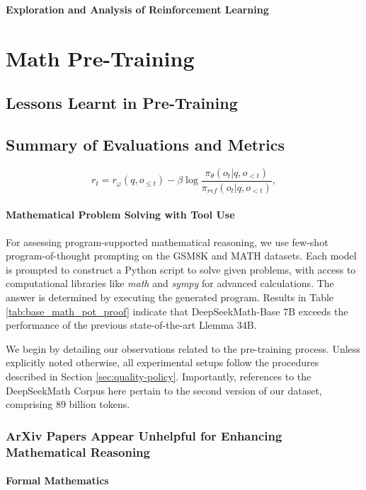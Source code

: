 \begin{itemize}[topsep=0pt]
\textbf{Exploration and Analysis of Reinforcement Learning}

\section{Math Pre-Training}

\subsection{Lessons Learnt in Pre-Training}

\subsection{Summary of Evaluations and Metrics}

\begin{equation}
    r_{t} = r_\varphi(q, o_{\le t}) - \beta \log\frac{\pi_{\theta}(o_{t}|q, o_{<t})}{\pi_{ref}(o_{t}|q, o_{<t})},
\label{eq:PPO-reward}
\end{equation}

\paragraph{Mathematical Problem Solving with Tool Use} For assessing program-supported mathematical reasoning, we use few-shot program-of-thought prompting \citep{pot,pal} on the GSM8K and MATH datasets. Each model is prompted to construct a Python script to solve given problems, with access to computational libraries like \textit{math} and \textit{sympy} for advanced calculations. The answer is determined by executing the generated program. Results in Table \ref{tab:base_math_pot_proof} indicate that DeepSeekMath-Base 7B exceeds the performance of the previous state-of-the-art Llemma 34B.

We begin by detailing our observations related to the pre-training process. Unless explicitly noted otherwise, all experimental setups follow the procedures described in Section \ref{sec:quality-policy}. Importantly, references to the DeepSeekMath Corpus here pertain to the second version of our dataset, comprising 89 billion tokens.

\subsubsection{ArXiv Papers Appear Unhelpful for Enhancing Mathematical Reasoning}

\paragraph{Formal Mathematics}


\end{itemize}

